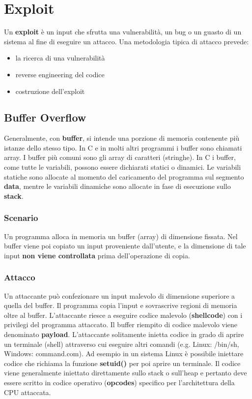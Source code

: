 \section{Exploit}
Un \textbf{exploit} è un input che sfrutta una vulnerabilità, un bug o un guasto di un sistema al fine di eseguire un attacco. Una metodologia tipica di attacco prevede:
\begin{itemize}
  \item la ricerca di una vulnerabilità
  \item reverse engineering del codice
  \item	costruzione dell’exploit
\end{itemize}

\subsection{Buffer Overflow}
Generalmente, con \textbf{buffer}, si intende una porzione di memoria contenente più istanze dello stesso tipo. In C e in molti altri programmi i buffer sono chiamati array. I buffer più comuni sono gli array di caratteri (stringhe).
In C i buffer, come tutte le variabili, possono essere dichiarati statici o dinamici. Le variabili statiche sono allocate al momento del caricamento del programma sul segmento \textbf{data}, mentre le variabili dinamiche sono allocate in fase di esecuzione sullo \textbf{stack}. \newline 

\subsubsection{Scenario}
Un programma alloca in memoria un buffer (array) di dimensione fissata. Nel buffer viene poi copiato un input proveniente dall'utente, e la dimensione di tale input \textbf{non viene controllata} prima dell'operazione di copia.

\subsubsection{Attacco}
Un attaccante può confezionare un input malevolo di dimensione superiore a quella del buffer. Il programma copia l'input e sovrascrive regioni di memoria oltre al buffer. L'attaccante riesce a eseguire codice malevolo (\textbf{shellcode}) con i privilegi del programma attaccato. Il buffer riempito di codice malevolo viene denominato \textbf{payload}. L'attaccante solitamente inietta codice in grado di aprire un terminale (shell) attraverso cui eseguire altri comandi (e.g. Linux: /bin/sh, Windows: command.com). Ad esempio in un sistema Linux è possibile iniettare codice che richiama la funzione \textbf{setuid()} per poi aprire un terminale. Il codice viene generalmente iniettato direttamente sullo stack o sull'heap e pertanto deve essere scritto in codice operativo (\textbf{opcodes}) specifico per l'architettura della CPU attaccata.

